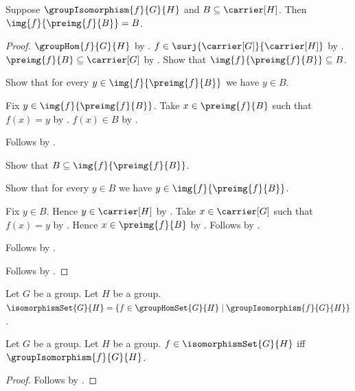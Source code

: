 \begin{theorem}\label{group_isomorphism_image_preimage}
    Suppose $\groupIsomorphism{f}{G}{H}$ and
        $B\subseteq\carrier[H]$.
    Then $\img{f}{\preimg{f}{B}}=B$.
\end{theorem}
\begin{proof}
    $\groupHom{f}{G}{H}$ by
        .
    $f\in\surj{\carrier[G]}{\carrier[H]}$ by
        .
    $\preimg{f}{B}\subseteq\carrier[G]$ by
        .
    Show that $\img{f}{\preimg{f}{B}}\subseteq B$.
    \begin{subproof}
        Show that for every $y\in\img{f}{\preimg{f}{B}}$ we have
            $y\in B$.
        \begin{subproof}
            Fix $y\in\img{f}{\preimg{f}{B}}$.
            Take $x\in\preimg{f}{B}$ such that $f(x)=y$ by
                .
            $f(x)\in B$ by .
        \end{subproof}
        Follows by .
    \end{subproof}
    Show that $B\subseteq\img{f}{\preimg{f}{B}}$.
    \begin{subproof}
        Show that for every $y\in B$ we have
            $y\in\img{f}{\preimg{f}{B}}$.
        \begin{subproof}
            Fix $y\in B$.
            Hence $y\in\carrier[H]$ by .
            Take $x\in\carrier[G]$ such that $f(x)=y$ by
                .
            Hence $x\in\preimg{f}{B}$ by
                .
            Follows by .
        \end{subproof}
        Follows by .
    \end{subproof}
    Follows by .
\end{proof}

\begin{definition}\label{isomorphism_set}
    Let $G$ be a group.
    Let $H$ be a group.
    $\isomorphismSet{G}{H}=
        \{f\in\groupHomSet{G}{H}
            \mid \groupIsomorphism{f}{G}{H}\}$.
\end{definition}

\begin{proposition}\label{isomorphism_set_iff}
    Let $G$ be a group.
    Let $H$ be a group.
    $f\in\isomorphismSet{G}{H}$ iff
        $\groupIsomorphism{f}{G}{H}$.
\end{proposition}
\begin{proof}
    Follows by
        .
\end{proof}
